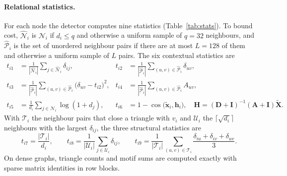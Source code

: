 \documentclass[pdflatex,sn-mathphys-ay]{sn-jnl}
\theoremstyle{plain}
\theoremstyle{remark}
\begin{document}
\paragraph{Relational statistics.} For each node the detector computes nine statistics (Table~\ref{tab:stats}). To bound cost, $\widehat{\mathcal{N}}_i$ is $\mathcal{N}_i$ if $d_i\le q$ and otherwise a uniform sample of $q=32$ neighbours, and $\widehat{\mathcal{P}}_i$ is the set of unordered neighbour pairs if there are at most $L=128$ of them and otherwise a uniform sample of $L$ pairs. The six contextual statistics are
\begin{align}
t_{i1}&=\frac{1}{|\widehat{\mathcal{N}}_i|}\sum_{j\in\widehat{\mathcal{N}}_i}\delta_{ij}, &
t_{i2}&=\frac{1}{|\widehat{\mathcal{P}}_i|}\sum_{(u,v)\in\widehat{\mathcal{P}}_i}\delta_{uv}, \nonumber\\
t_{i3}&=\frac{1}{|\widehat{\mathcal{P}}_i|}\sum_{(u,v)\in\widehat{\mathcal{P}}_i}\big(\delta_{uv}-t_{i2}\big)^2, &
t_{i4}&=\frac{1}{|\widehat{\mathcal{P}}_i|}\sum_{(u,v)\in\widehat{\mathcal{P}}_i}A_{uv}, \nonumber\\
t_{i5}&=\frac{1}{d_i}\sum_{j\in\mathcal{N}_i}\log(1+d_j), &
t_{i6}&=1-\cos\big(\tilde{\mathbf{x}}_i,\mathbf{h}_i\big),\quad \mathbf{H}=(\mathbf{D}+\mathbf{I})^{-1}(\mathbf{A}+\mathbf{I})\tilde{\mathbf{X}}.
\end{align}
With $\mathcal{T}_i$ the neighbour pairs that close a triangle with $v_i$ and $\mathcal{U}_i$ the $\lceil\sqrt{d_i}\rceil$ neighbours with the largest $\delta_{ij}$, the three structural statistics are
\begin{equation}
t_{i7}=\frac{|\mathcal{T}_i|}{d_i}, \qquad
t_{i8}=\frac{1}{|\mathcal{U}_i|}\sum_{j\in\mathcal{U}_i}\delta_{ij}, \qquad
t_{i9}=\frac{1}{|\mathcal{T}_i|}\sum_{(u,v)\in\mathcal{T}_i}\frac{\delta_{iu}+\delta_{iv}+\delta_{uv}}{3}.
\end{equation}
On dense graphs, triangle counts and motif sums are computed exactly with sparse matrix identities in row blocks.
\end{document}
